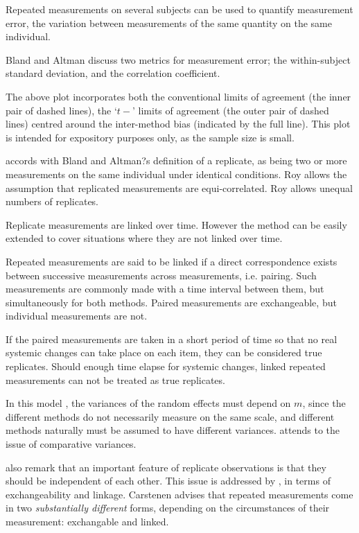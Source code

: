 \documentclass[12pt, a4paper]{report}
\theoremstyle{plain}
\theoremstyle{definition}
\theoremstyle{remark}
\begin{document}
	Repeated measurements on several subjects can be used to quantify
	measurement error, the variation between measurements of the same
	quantity on the same individual.
	
	Bland and Altman discuss two metrics for measurement error; the
	within-subject standard deviation, and the correlation
	coefficient.
	
	The above plot incorporates both the conventional limits of agreement (the inner pair of dashed lines), the `$t-$' limits of
	agreement (the outer pair of dashed lines) centred around the inter-method bias (indicated by the full line). This plot is
	intended for expository purposes only, as the sample size is small.
	
	\citet{ARoy2009} accords with Bland and Altman?s definition of a replicate, as being two or more measurements on the same individual under identical conditions.
	Roy allows the assumption that replicated measurements are equi-correlated.
	Roy allows unequal numbers of replicates.
	
	
	Replicate measurements are linked over time. However the method can be easily extended to cover situations where they are not linked over time.
	
	Repeated measurements are said to be linked if a direct correspondence exists between successive measurements across measurements, i.e. pairing. Such measurements are commonly made with a time interval between them, but simultaneously for both methods. Paired measurements are exchangeable, but individual measurements are not.
	
	If the paired measurements are taken
	in a short period of time so that no real systemic changes can take place on each item, they can be considered true replicates.
	Should enough time elapse for systemic changes, linked repeated measurements can not be treated as true replicates.
	
	
	
	
	In this model , the variances of the random effects must depend on
	$m$, since the different methods do not necessarily measure on the 	same scale, and different methods naturally must be assumed to have different variances. \citet{BXC2004} attends to the issue of comparative variances.
	

	\citet{BA99} also remark that an important feature of replicate observations is that they should be independent
	of each other. This issue is addressed by \citet{BXC2010}, in terms of exchangeability and linkage. Carstenen advises that repeated measurements come in two \emph{substantially different} forms, depending on the circumstances of their measurement: exchangable and linked.
	
\end{document}
